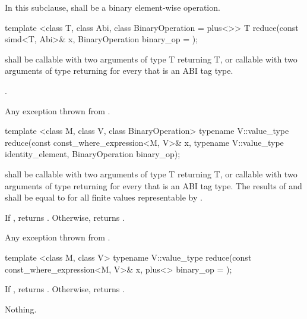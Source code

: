 \pnum In this subclause,  shall be a binary element-wise operation.

\begin{itemdecl}
template <class T, class Abi, class BinaryOperation = plus<>>
T reduce(const simd<T, Abi>& x, BinaryOperation binary_op = {});
\end{itemdecl}
\begin{itemdescr}
  \pnum\requires {} shall be callable with two arguments of type \type T returning \type T, or callable with two arguments of type \simd[<T, A1>] returning \simd[<T, A1>] for every  that is an ABI tag type.

  \pnum\returns {} \foralli.

  \pnum\throws Any exception thrown from .

  \pnum{}
\end{itemdescr}

\begin{itemdecl}
template <class M, class V, class BinaryOperation>
typename V::value_type reduce(const const_where_expression<M, V>& x, typename V::value_type identity_element,
                              BinaryOperation binary_op);
\end{itemdecl}
\begin{itemdescr}
  \pnum\requires {} shall be callable with two arguments of type \type T returning \type T, or callable with two arguments of type \simd[<T, A1>] returning \simd[<T, A1>] for every  that is an ABI tag type.
  The results of  and  shall be equal to  for all finite values  representable by .

  \pnum\returns
  If , returns .
  Otherwise, returns  .

  \pnum\throws Any exception thrown from .
\end{itemdescr}

\begin{itemdecl}
template <class M, class V>
typename V::value_type reduce(const const_where_expression<M, V>& x, plus<> binary_op = {});
\end{itemdecl}
\begin{itemdescr}
  \pnum\returns
  If , returns .
  Otherwise, returns  .

  \pnum\throws Nothing.
\end{itemdescr}

